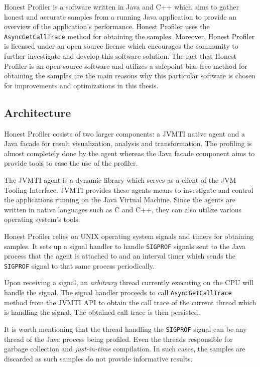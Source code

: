 \documentclass[..thesis.tex]{subfiles}
\begin{document}
Honest Profiler \cite{hon_prof} is a software written in Java and C++ which aims to gather honest and accurate samples from a running Java application to provide an overview of the application's performance. Honest Profiler uses the \texttt{Async\-Get\-Call\-Trace} method for obtaining the samples. Moreover, Honest Profiler is licensed under an open source license which encourages the community to further investigate and develop this software solution. The fact that Honest Profiler is an open source software and utilizes a safepoint bias free method for obtaining the samples are the main reasons why this particular software is chosen for improvements and optimizations in this thesis.

\subsection{Architecture}
Honest Profiler cosists of two larger components: a JVMTI native agent and a Java facade for result visualization, analysis and transformation. The profiling is almost completely done by the agent whereas the Java facade component aims to provide tools to ease the use of the profiler.

The JVMTI agent is a dynamic library which serves as a client of the JVM Tooling Interface. \cite{jvmtm} JVMTI provides these agents means to investigate and control the applications running on the Java Virtual Machine. Since the agents are written in native languages such as C and C++, they can also utilize various operating system's tools.

Honest Profiler relies on UNIX operating system signals and timers for obtaining samples.
It sets up a signal handler to handle \texttt{SIGPROF} signals sent to the Java process that the agent is attached to and an interval timer which sends the \texttt{SIGPROF} signal to that same process periodically. 

Upon receiving a signal, an \textit{arbitrary} thread currently executing on the CPU will handle the signal. \cite{stevens_advanced_2013} The signal handler proceeds to call \texttt{AsyncGetCallTrace} method from the JVMTI API to obtain the call trace of the current thread which is handling the signal. The obtained call trace is then persisted.

It is worth mentioning that the thread handling the \texttt{SIGPROF} signal can be any thread of the Java process being profiled. Even the threads responsible for garbage collection and \textit{just-in-time} compilation. In such cases, the samples are discarded as such samples do not provide informative results.
\end{document}
